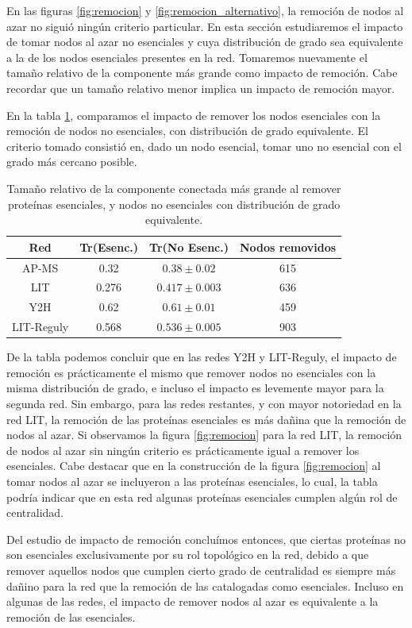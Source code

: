 \par En las figuras \ref{fig:remocion} y \ref{fig:remocion_alternativo}, la remoción de nodos al azar no siguió ningún criterio particular. En esta sección estudiaremos el impacto de tomar nodos al azar no esenciales y cuya distribución de grado sea equivalente a la de los nodos esenciales presentes en la red. Tomaremos nuevamente el tamaño relativo de la componente más grande como impacto de remoción. Cabe recordar que un tamaño relativo menor implica un impacto de remoción mayor.
\par En la tabla \ref{table:remocion}, comparamos el impacto de remover los nodos esenciales con la remoción de nodos no esenciales, con distribución de grado equivalente. El criterio tomado consistió en, dado un nodo esencial, tomar uno no esencial con el grado más cercano posible.
\begin{table}
\centering
\label{table:remocion}
\begin{tabular}{c c c c}
\hline \hline
Red & Tr(Esenc.) & Tr(No Esenc.) & Nodos removidos \\
\hline
AP-MS & 0.32 & $0.38 \pm 0.02$ & 615 \\
LIT & 0.276 & $0.417 \pm 0.003$ & 636 \\
Y2H & 0.62 & $0.61 \pm 0.01$ & 459 \\
LIT-Reguly & 0.568 & $0.536 \pm 0.005$ & 903 \\
\hline\hline
\end{tabular}
\caption{Tamaño relativo de la componente conectada más grande al remover proteínas esenciales, y nodos no esenciales con distribución de grado equivalente.}

\end{table}
\par De la tabla podemos concluir que en las redes Y2H y LIT-Reguly, el impacto de remoción es prácticamente el mismo que remover nodos no esenciales con la misma distribución de grado, e incluso el impacto es levemente mayor para la segunda red. Sin embargo, para las redes restantes, y con mayor notoriedad en la red LIT, la remoción de las proteínas esenciales es más dañina que la remoción de nodos al azar. Si observamos la figura \ref{fig:remocion} para la red LIT, la remoción de nodos al azar sin ningún criterio es prácticamente igual a remover los esenciales. Cabe destacar que en la construcción de la figura \ref{fig:remocion} al tomar nodos al azar se incluyeron a las proteínas esenciales, lo cual, la tabla podría indicar que en esta red algunas proteínas esenciales cumplen algún rol de centralidad.
\par Del estudio de impacto de remoción concluímos entonces, que ciertas proteínas no son esenciales exclusivamente por su rol topológico en la red, debido a que remover aquellos nodos que cumplen cierto grado de centralidad es siempre más dañino para la red que la remoción de las catalogadas como esenciales. Incluso en algunas de las redes, el impacto de remover nodos al azar es equivalente a la remoción de las esenciales.


